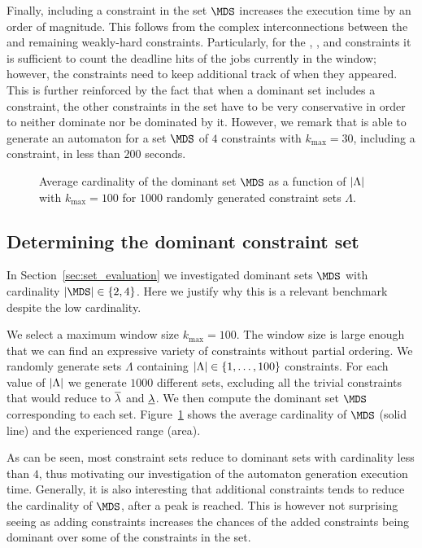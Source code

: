 Finally, including a \tRH{} constraint in the set $\MDS$ increases the execution time by an order of magnitude.
This follows from the complex interconnections between the \tRH{} and remaining weakly-hard constraints.
Particularly, for the \tAH{}, \tAM{}, and \tRM{} constraints it is sufficient to count the deadline hits of the jobs currently in the window; however, the \tRH{} constraints need to keep additional track of when they appeared.
This is further reinforced by the fact that when a dominant set includes a \tRH{} constraint, the other constraints in the set have to be very conservative in order to neither dominate nor be dominated by it.
However, we remark that \tool{} is able to generate an automaton for a set $\MDS$ of $4$ constraints with $k_{\max}=30$, including a \tRH{} constraint, in less than $200$ seconds.

\begin{figure}[t]
    \centering
    
    \caption{Average cardinality of the dominant set $\MDS$ as a function of $\left|\Lambda\right|$ with $k_{\max} = 100$ for $1000$ randomly generated constraint sets $\Lambda$.}
    \label{fig:dominant-set-comparison}
\end{figure}

\subsection{Determining the dominant constraint set}
\label{sec:set_dominant_cardinality}%

In Section~\ref{sec:set_evaluation} we investigated dominant sets $\MDS$ with cardinality $\abs{\MDS} \in \{2,4\}$.
Here we justify why this is a relevant benchmark despite the low cardinality.

We select a maximum window size $k_{\max} = 100$.
The window size is large enough that we can find an expressive variety of constraints without partial ordering.
We randomly generate sets $\Lambda$ containing $\left|\Lambda\right| \in \{1,\dots,100\}$ constraints.
For each value of $\left|\Lambda\right|$ we generate $1000$ different sets, excluding all the trivial constraints that would reduce to $\overline{\lambda}$ and $\underline{\lambda}$.
We then compute the dominant set $\MDS$ corresponding to each set.
Figure~\ref{fig:dominant-set-comparison} shows the average cardinality of $\MDS$ (solid line) and the experienced range (area).

As can be seen, most constraint sets reduce to dominant sets with cardinality less than $4$, thus motivating our investigation of the automaton generation execution time.
Generally, it is also interesting that additional constraints tends to reduce the cardinality of $\MDS$, after a peak is reached.
This is however not surprising seeing as adding constraints increases the chances of the added constraints being dominant over some of the constraints in the set.
